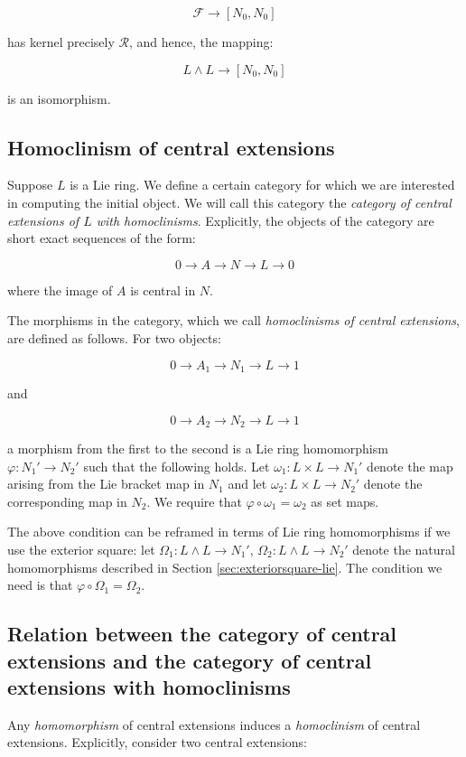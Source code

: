 \documentclass{ucetd}
\begin{document}
$$\mathcal{F} \to [N_0,N_0]$$

has kernel precisely $\mathcal{R}$, and hence, the mapping:

$$L \wedge L \to [N_0,N_0]$$

is an isomorphism.

\subsection{Homoclinism of central extensions}\label{sec:homoclinism-central-extensions-lie}

Suppose $L$ is a Lie ring. We define a certain category for which we are
interested in computing the initial object. We will call this category
the {\em category of central extensions of $L$ with homoclinisms}. Explicitly,
the objects of the category are short exact sequences of the form:

$$0 \to A \to N \to L \to 0$$

where the image of $A$ is central in $N$.

The morphisms in the category, which we call {\em homoclinisms of
  central extensions}, are defined as follows. For two objects:

$$0 \to A_1 \to N_1 \to L \to 1$$

and

$$0 \to A_2 \to N_2 \to L \to 1$$

a morphism from the first to the second is a Lie ring homomorphism
$\varphi: N_1' \to N_2'$ such that the following holds. Let $\omega_1:
L \times L \to N_1'$ denote the map arising from the Lie bracket map in
$N_1$ and let $\omega_2: L \times L \to N_2'$ denote the corresponding
map in $N_2$. We require that $\varphi \circ \omega_1 = \omega_2$ as set maps.

The above condition can be reframed in terms of Lie ring homomorphisms if
we use the exterior square: let $\Omega_1: L \wedge L \to N_1'$,
$\Omega_2: L \wedge L \to N_2'$ denote the natural homomorphisms
described in Section \ref{sec:exteriorsquare-lie}. The condition we need
is that $\varphi \circ \Omega_1 = \Omega_2$.

\subsection{Relation between the category of central extensions and the category of central extensions with homoclinisms}

Any {\em homomorphism} of central extensions induces a {\em
  homoclinism} of central extensions. Explicitly, consider two central
extensions:
\end{document}
